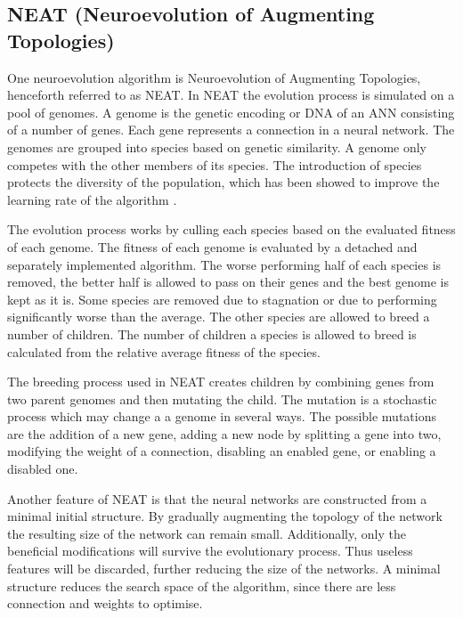 \subsection{NEAT (Neuroevolution of Augmenting Topologies)} 
\label{theory:neat}
One neuroevolution algorithm is Neuroevolution of Augmenting Topologies, henceforth referred to as NEAT. In NEAT the evolution process is simulated on a pool of genomes. A genome is the genetic encoding or DNA of an ANN consisting of a number of genes. Each gene represents a connection in a neural network. The genomes are grouped into species based on genetic similarity. A genome only competes with the other members of its species. The introduction of species protects the diversity of the population, which has been showed to improve the learning rate of the algorithm \cite{stanley:neat}.  

The evolution process works by culling each species based on the evaluated fitness of each genome. The fitness of each genome is evaluated by a detached and separately implemented algorithm. The worse performing half of each species is removed, the better half is allowed to pass on their genes and the best genome is kept as it is. Some species are removed due to stagnation or due to performing significantly worse than the average. The other species are allowed to breed a number of children. The number of children a species is allowed to breed is calculated from the relative average fitness of the species. 

The breeding process used in NEAT creates children by combining genes from two parent genomes and then mutating the child. The mutation is a stochastic process which may change a a genome in several ways. The possible mutations are the addition of a new gene, adding a new node by splitting a gene into two, modifying the weight of a connection, disabling an enabled gene, or enabling a disabled one.

Another feature of NEAT is that the neural networks are constructed from a minimal initial structure. By gradually augmenting the topology of the network the resulting size of the network can remain small. Additionally, only the beneficial modifications will survive the evolutionary process. Thus useless features will be discarded, further reducing the size of the networks. A minimal structure reduces the search space of the algorithm, since there are less connection and weights to optimise. 





